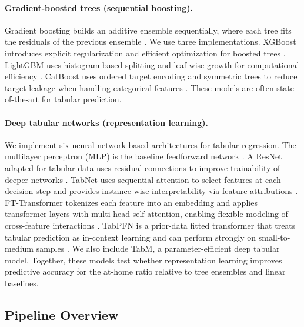 \documentclass[12pt,a4paper]{article}
\begin{document}
\paragraph{Gradient-boosted trees (sequential boosting).}
Gradient boosting builds an additive ensemble sequentially, where each tree fits the residuals of the previous ensemble \citep{Friedman2001, Hastie2009}. We use three implementations. XGBoost introduces explicit regularization and efficient optimization for boosted trees \citep{Chen2016XGBoost}. LightGBM uses histogram-based splitting and leaf-wise growth for computational efficiency \citep{Ke2017LightGBM}. CatBoost uses ordered target encoding and symmetric trees to reduce target leakage when handling categorical features \citep{Prokhorenkova2018CatBoost}. These models are often state-of-the-art for tabular prediction.

\paragraph{Deep tabular networks (representation learning).}
We implement six neural-network-based architectures for tabular regression. The multilayer perceptron (MLP) is the baseline feedforward network \citep{Goodfellow2016}. A ResNet adapted for tabular data uses residual connections to improve trainability of deeper networks \citep{Gorishniy2021FTTransformer}. TabNet uses sequential attention to select features at each decision step and provides instance-wise interpretability via feature attributions \citep{Arik2021TabNet}. FT-Transformer tokenizes each feature into an embedding and applies transformer layers with multi-head self-attention, enabling flexible modeling of cross-feature interactions \citep{Gorishniy2021FTTransformer}. TabPFN is a prior-data fitted transformer that treats tabular prediction as in-context learning and can perform strongly on small-to-medium samples \citep{Hollmann2022TabPFN}. We also include TabM, a parameter-efficient deep tabular model. Together, these models test whether representation learning improves predictive accuracy for the at-home ratio relative to tree ensembles and linear baselines.

\subsection{Pipeline Overview}
\label{sec:pipeline}
\end{document}
